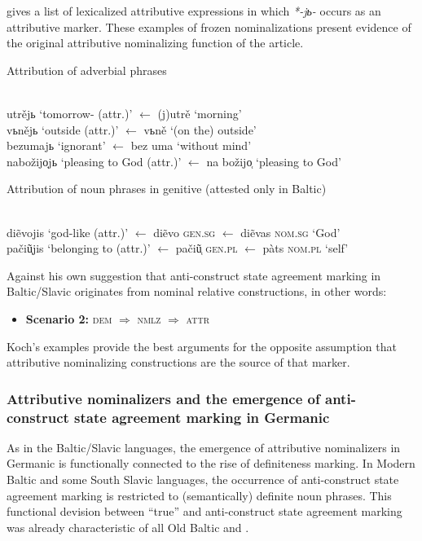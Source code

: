 \citet[467–468]{koch1999} gives a list of lexicalized attributive expressions in which \textit{*-jь-} occurs as an attributive marker. These examples of frozen nominalizations present evidence of the original attributive nominalizing function of the  article. 
\begin{exe}
\ex
\begin{xlist}
\ex \rm{Attribution of adverbial phrases}
\begin{xlist}
\ex \rm{}\\
	utrějь \rm{‘tomorrow- (attr.)’ $\leftarrow$} (j)utrě \rm{‘morning’}
\ex \rm{}\\
	vьnějь \rm{‘outside (attr.)’ $\leftarrow$} vьně \rm{‘(on the) outside’}\\
	bezumajь \rm{‘ignorant’ $\leftarrow$} bez uma \rm{‘without mind’}
\ex \rm{}\\
	nabožijo̜jь \rm{‘pleasing to God (attr.)’ $\leftarrow$} na božijo̜ \rm{‘pleasing to God’}
\end{xlist}
\ex \rm{Attribution of noun phrases in genitive (attested only in Baltic)}
\begin{xlist}
\ex \rm{}\\
	di\~evojis \rm{‘god-like (attr.)’ $\leftarrow$} di\~evo \rm{\textsc{gen.sg} $\leftarrow$} di\~evas \rm{\textsc{nom.sg} ‘God’}
\ex \rm{}\\
	pači\~u̜jis \rm{‘belonging to (attr.)’ $\leftarrow$} pači\~u̜ \rm{\textsc{gen.pl} $\leftarrow$} pàts \rm{\textsc{nom.pl} ‘self’}
\end{xlist}
\end{xlist}
\end{exe}
Against his own suggestion that anti\hyp{}construct state agreement marking in Baltic\slash{}Slavic originates from nominal relative constructions, in other words:
\begin{itemize}
\item \textbf{Scenario 2:} \textsc{dem $\Rightarrow$ nmlz $\Rightarrow$ attr}
\end{itemize}
Koch's examples provide the best arguments for the opposite assumption that attributive nominalizing constructions are the source of that marker.

\subsubsection[Germanic]{Attributive nominalizers and the emergence of anti\hyp{}construct state agreement marking in Germanic} \label{germanic diachr}
As in the Baltic\slash{}Slavic languages, the emergence of attributive nominalizers in Germanic is functionally connected to the rise of definiteness marking. In Modern Baltic and some South Slavic languages, the occurrence of anti\hyp{}construct state agreement marking is restricted to (semantically) definite noun phrases. This functional devision between “true”  and anti\hyp{}construct state agreement marking was already characteristic of all Old Baltic and . 

